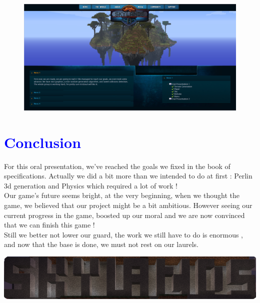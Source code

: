 \documentclass[article]{report} %
\begin{document}
				\begin{figure}[h]
					\includegraphics[scale=0.34]{images/Others/website.png}
				\end{figure}

		\chapter{\textcolor{blue}{Conclusion}}
			For this oral presentation, we've reached the goals we fixed in the book of specifications. Actually we did a bit more than we intended to do at first : Perlin 3d generation and Physics which required a lot of work !\\
			
			Our game's future seems bright, at the very beginning, when we thought the game,  we believed that our project might be a bit ambitious. However seeing our current progress in the game,  boosted up our moral and we are now convinced that we can finish this game !\\

			Still we better not lower our guard, the work we still have to do is enormous , and now that the base is done, we must not rest on our laurels.
	
				\begin{center}
					\includegraphics[width=16cm]{images/Titles/Skylands_logo.png}
				\end{center}     	     		
\end{document}
